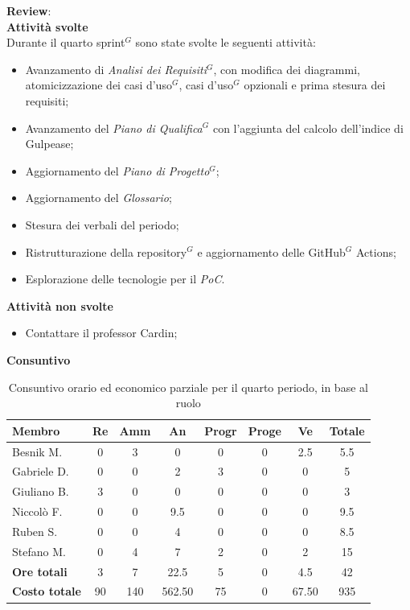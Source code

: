 \documentclass[a4paper,10pt]{article}
\begin{document}
\textbf{Review}: \\
\textbf{Attività svolte}\\
Durante il quarto sprint$^G$ sono state svolte le seguenti attività:
\begin{itemize}
  \item Avanzamento di \textit{Analisi dei Requisiti$^G$}, con modifica dei diagrammi, atomicizzazione dei casi d'uso$^G$, casi d'uso$^G$ opzionali e prima stesura dei requisiti;
  \item Avanzamento del \textit{Piano di Qualifica$^G$} con l'aggiunta del calcolo dell'indice di Gulpease;
  \item Aggiornamento del \textit{Piano di Progetto$^G$};
  \item Aggiornamento del \textit{Glossario};
  \item Stesura dei verbali del periodo;
  \item Ristrutturazione della repository$^G$ e aggiornamento delle GitHub$^G$ Actions;
  \item Esplorazione delle tecnologie per il \textit{PoC}.
\end{itemize}
\textbf{Attività non svolte}\\
\begin{itemize}
  \item Contattare il professor Cardin;
\end{itemize}
\textbf{Consuntivo}
\begin{table}[H]
  \centering
  \begin{tabular}{|l|c|c|c|c|c|c|c|}
    \hline
    \textbf{Membro} & \textbf{Re} & \textbf{Amm} & \textbf{An} & \textbf{Progr} & \textbf{Proge} & \textbf{Ve} & \textbf{Totale} \\
    \hline
    Besnik M.   & 0   & 3   & 0 & 0 & 0 & 2.5 & 5.5   \\
    Gabriele D. & 0   & 0   & 2   & 3 & 0 & 0 & 5 \\
    Giuliano B. & 3 & 0 & 0 & 0 & 0 & 0   & 3 \\
    Niccolò F.  & 0   & 0   & 9.5  & 0 & 0 & 0   & 9.5   \\
    Ruben S.    & 0   & 0 & 4   & 0 & 0 & 0   & 8.5  \\
    Stefano M.  & 0   & 4   & 7  & 2 & 0 & 2   & 15   \\
    \hline
    \textbf{Ore totali} & 3 & 7 & 22.5 & 5 & 0 & 4.5 & 42 \\
    \hline
    \textbf{Costo totale} & 90 & 140 & 562.50 & 75 & 0 & 67.50 & 935 \\
    \hline
  \end{tabular}
  \caption{Consuntivo orario ed economico parziale per il quarto periodo, in base al ruolo}
\end{table}
\end{document}

